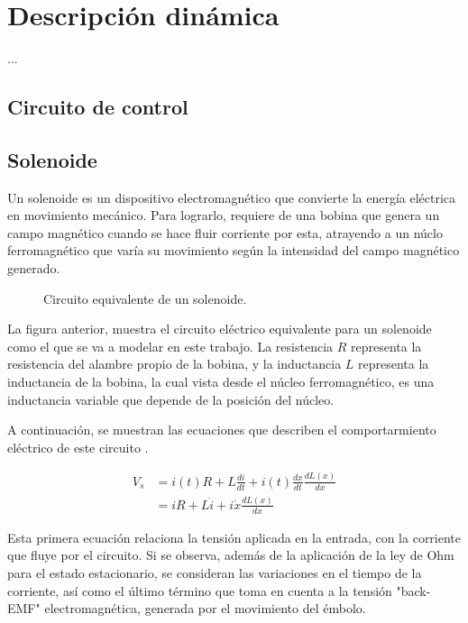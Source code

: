 \documentclass[journal]{IEEEtran}
\begin{document}
\section{Descripción dinámica}

...

\subsection{Circuito de control}

\subsection{Solenoide}
Un solenoide es un dispositivo electromagnético que convierte la energía eléctrica en movimiento mecánico. Para lograrlo, 
requiere de una bobina que genera un campo magnético cuando se hace fluir corriente por esta, atrayendo a un núclo ferromagnético
que varía su movimiento según la intensidad del campo magnético generado. 


\begin{figure}[H]
  \centering
   
  \caption{Circuito equivalente de un solenoide.}
  \label{fig:circuito_solenoide}
\end{figure}

La figura anterior, muestra el circuito eléctrico equivalente para un solenoide como el que se va a modelar
en este trabajo. La resistencia $R$ representa la resistencia del alambre propio de la bobina, y la inductancia $L$
representa la inductancia de la bobina, la cual vista desde el núcleo ferromagnético, 
es una inductancia variable que depende de la posición del núcleo.

\setlength{\parskip}{1em}

A continuación, se muestran las ecuaciones que describen el comportarmiento 
eléctrico de este circuito \cite{Alexander2018}.

\begin{equation}
\begin{aligned}
    V_s &= i(t)R + L \frac{di}{dt} + i(t) \frac{dx}{dt} \frac{dL(x)}{dx} \\
        &= iR + L \dot{i} + i \dot{x} \frac{dL(x)}{dx}
\end{aligned}
\label{eq:eléctrica_solenoide}
\end{equation}

Esta primera ecuación relaciona la tensión aplicada en la entrada, con la corriente que fluye 
por el circuito. Si se observa, además de la aplicación de la ley de Ohm para el estado estacionario,
se consideran las variaciones en el tiempo de la corriente, así como el último término que toma en cuenta 
a la tensión "back-EMF" electromagnética, generada por el movimiento del émbolo.
\end{document}
